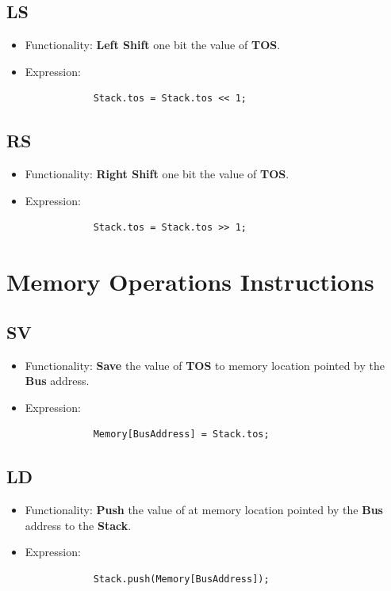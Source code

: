 \documentclass[11pt]{report}
\begin{document}
    \subsection{LS}
    \begin{itemize}
        \item Functionality: \textbf{Left Shift} one bit the value of \textbf{TOS}.
        \item Expression:
        \begin{verbatim}
            Stack.tos = Stack.tos << 1;
        \end{verbatim}
    \end{itemize}

    \subsection{RS}
    \begin{itemize}
        \item Functionality: \textbf{Right Shift} one bit the value of \textbf{TOS}.
        \item Expression:
        \begin{verbatim}
            Stack.tos = Stack.tos >> 1;
        \end{verbatim}
    \end{itemize}

    \section{Memory Operations Instructions}
    \subsection{SV}
    \begin{itemize}
        \item Functionality: \textbf{Save} the value of \textbf{TOS} to memory location 
                pointed by the \textbf{Bus} address.
        \item Expression:
        \begin{verbatim}
            Memory[BusAddress] = Stack.tos;
        \end{verbatim}
    \end{itemize}

    \subsection{LD}
    \begin{itemize}
        \item Functionality: \textbf{Push} the value of at memory location 
                pointed by the \textbf{Bus} address to the \textbf{Stack}.
        \item Expression:
        \begin{verbatim}
            Stack.push(Memory[BusAddress]);
        \end{verbatim}
    \end{itemize}
\end{document}
